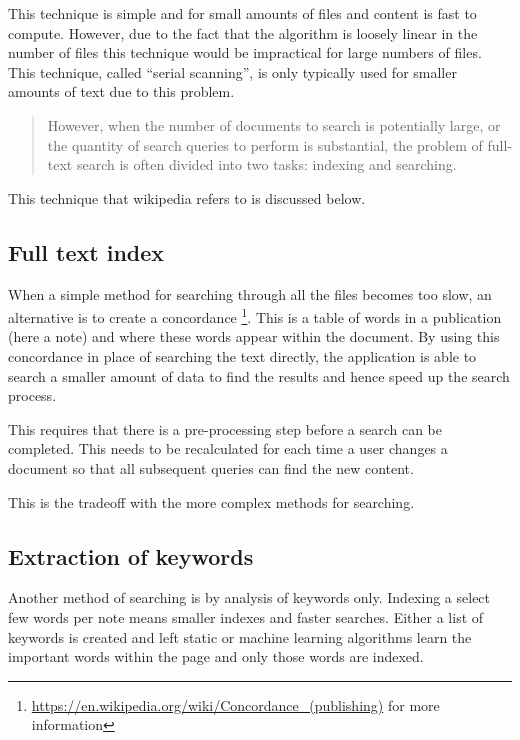 This technique is simple and for small amounts of files and content is fast to
compute. However, due to the fact that the algorithm is loosely linear in the
number of files this technique would be impractical for large numbers of files.
This technique, called ``serial scanning'', is only typically used for smaller amounts of text due to this problem.

\blockquote{
However, when the number of documents to search is potentially large, or the quantity of search queries to perform is substantial, the problem of full-text search is often divided into two tasks: indexing and searching.
}\cite{wiki:full-text-search}

This technique that wikipedia refers to is discussed below.

\subsection{Full text index}\label{full-text-index}

When a simple method for searching through all the files becomes too slow, an
alternative is to create a concordance
\footnote{\url{https://en.wikipedia.org/wiki/Concordance_(publishing)} for more
information}. This is a table of words in a publication (here a note) and where
these words appear within the document. By using this concordance in place of
searching the text directly, the application is able to search a smaller amount
of data to find the results and hence speed up the search process.

This requires that there is a pre-processing step before a search can be
completed. This needs to be recalculated for each time a user changes a
document so that all subsequent queries can find the new content.

This is the tradeoff with the more complex methods for searching.

\subsection{Extraction of keywords}\label{extraction-of-keywords}

Another method of searching is by analysis of keywords only. Indexing a
select few words per note means smaller indexes and faster searches.
Either a list of keywords is created and left static or machine learning
algorithms learn the important words within the page and only those
words are indexed.

